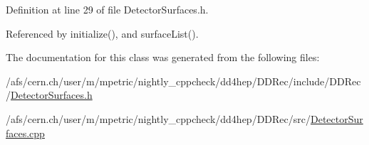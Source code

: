 Definition at line 29 of file DetectorSurfaces.h.

Referenced by initialize(), and surfaceList().

The documentation for this class was generated from the following files:\begin{DoxyCompactItemize}
\item 
/afs/cern.ch/user/m/mpetric/nightly\_\-cppcheck/dd4hep/DDRec/include/DDRec/\hyperlink{_detector_surfaces_8h}{DetectorSurfaces.h}\item 
/afs/cern.ch/user/m/mpetric/nightly\_\-cppcheck/dd4hep/DDRec/src/\hyperlink{_detector_surfaces_8cpp}{DetectorSurfaces.cpp}\end{DoxyCompactItemize}
